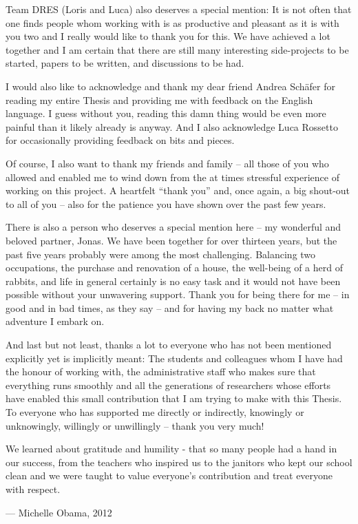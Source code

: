 Team DRES (Loris and Luca) also deserves a special mention: It is not often that one finds people whom working with is as productive and pleasant as it is with you two and I really would like to thank you for this. We have achieved a lot together and I am certain that there are still many interesting side-projects to be started, papers to be written, and discussions to be had.

I would also like to acknowledge and thank my dear friend Andrea Schäfer for reading my entire Thesis and providing me with feedback on the English language. I guess without you, reading this damn thing would be even more painful than it likely already is anyway. And I also acknowledge Luca Rossetto for occasionally providing feedback on bits and pieces.

Of course, I also want to thank my friends and family -- all those of you who allowed and enabled me to wind down from the at times stressful experience of working on this project. A heartfelt ``thank you'' and, once again, a big shout-out to all of you -- also for the patience you have shown over the past few years.

There is also a person who deserves a special mention here -- my wonderful and beloved partner, Jonas. We have been together for over thirteen years, but the past five years probably were among the most challenging. Balancing two occupations, the purchase and renovation of a house, the well-being of a herd of rabbits, and life in general certainly is no easy task and it would not have been possible without your unwavering support. Thank you for being there for me -- in good and in bad times, as they say -- and for having my back no matter what adventure I embark on.

And last but not least, thanks a lot to everyone who has not been mentioned explicitly yet is implicitly meant: The students and colleagues whom I have had the honour of working with, the administrative staff who makes sure that everything runs smoothly and all the generations of researchers whose efforts have enabled this small contribution that I am trying to make with this Thesis. To everyone who has supported me directly or indirectly, knowingly or unknowingly, willingly or unwillingly -- thank you very much!

\epigraph{We learned about gratitude and humility - that so many people had a hand in our success, from the teachers who inspired us to the janitors who kept our school clean and we were taught to value everyone's contribution and treat everyone with respect.}{--- \textup{Michelle Obama}, 2012}


\cleardoublepage

